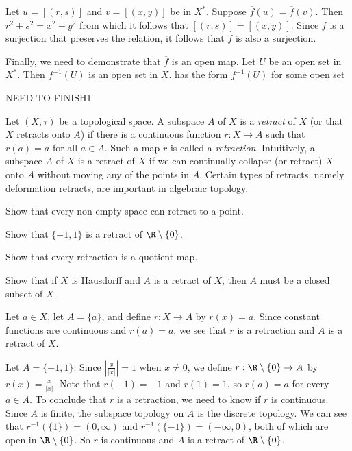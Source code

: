 Let $u = [(r,s)]$ and $v = [(x,y)]$ be in $X^*$. Suppose $\overline{f}(u) = \overline{f}(v)$. Then $r^2+s^2 = x^2+y^2$ from which it follows that $[(r,s)] = [(x,y)]$. Since $f$ is a surjection that preserves the relation, it follows that $\overline{f}$ is also a surjection.

Finally, we need to demonstrate that $\overline{f}$ is an open map. Let $U$ be an open set in $X^*$. Then $f^{-1}(U)$ is an open set in $X$. has the form $f^{-1}(U)$ for some open set  

NEED TO FINISH1 

\ea


\item Let $(X,\tau)$ be a topological space. A subspace $A$ of $X$ is a \emph{retract} of $X$ (or that $X$ retracts onto $A$) if there is a continuous function $r : X \to A$ such that $r(a) = a$ for all $a \in A$. Such a map $r$ is called a \emph{retraction}. Intuitively, a subspace $A$ of $X$ is a retract of $X$ if we can continually collapse (or retract) $X$ onto $A$ without moving any of the points in $A$. Certain types of retracts, namely deformation retracts, are important in algebraic topology.
\ba

\item Show that every non-empty space can retract to a point. 

\item Show that $\{-1,1\}$ is a retract of $\R \setminus \{0\}$. 

\item Show that every retraction is a quotient map.

\item Show that if $X$ is Hausdorff and $A$ is a retract of $X$, then $A$ must be a closed subset of $X$. 

\ea



\ExerciseSolution

\ba

\item Let $a \in X$, let $A = \{a\}$, and define $r : X \to A$ by $r(x) = a$. Since constant functions are continuous and $r(a) = a$, we see that $r$ is a retraction and $A$ is a retract of $X$. 

\item Let $A = \{-1,1\}$. Since $\left| \frac{x}{|x|} \right| = 1$ when $x \neq 0$, we define $r: \R \setminus \{0\} \to A$ by $r(x) = \frac{x}{|x|}$. Note that $r(-1) = -1$ and $r(1) = 1$, so $r(a) = a$ for every $a \in A$. To conclude that $r$ is a retraction, we need to know if $r$ is continuous. Since $A$ is finite, the subspace topology on $A$ is the discrete topology. We can see that $r^{-1}(\{1\}) = (0,\infty)$ and $r^{-1}(\{-1\}) = (-\infty, 0)$, both of which are open in $\R \setminus \{0\}$. So $r$ is continuous and $A$ is a retract of $\R \setminus \{0\}$. 

